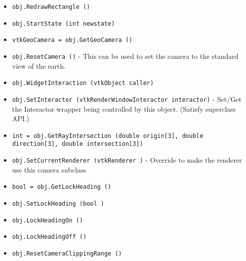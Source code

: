 \begin{itemize}
\item  \verb|obj.RedrawRectangle ()|

\item  \verb|obj.StartState (int newstate)|

\item  \verb|vtkGeoCamera = obj.GetGeoCamera ()|

\item  \verb|obj.ResetCamera ()| -  This can be used to set the camera to the standard view of the earth.

\item  \verb|obj.WidgetInteraction (vtkObject caller)|

\item  \verb|obj.SetInteractor (vtkRenderWindowInteractor interactor)| -  Set/Get the Interactor wrapper being controlled by this object.
 (Satisfy superclass API.)

\item  \verb|int = obj.GetRayIntersection (double origin[3], double direction[3], double intersection[3])|

\item  \verb|obj.SetCurrentRenderer (vtkRenderer )| -  Override to make the renderer use this camera subclass

\item  \verb|bool = obj.GetLockHeading ()|

\item  \verb|obj.SetLockHeading (bool )|

\item  \verb|obj.LockHeadingOn ()|

\item  \verb|obj.LockHeadingOff ()|

\item  \verb|obj.ResetCameraClippingRange ()|

\end{itemize}
